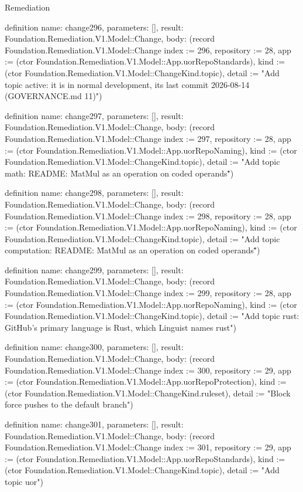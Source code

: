 \begin{lexlean}{Remediation}
\begin{semanticmodule}
definition{
  name: change296,
  parameters: [],
  result: Foundation.Remediation.V1.Model::Change,
  body: (record Foundation.Remediation.V1.Model::Change {index := 296, repository := 28, app := (ctor Foundation.Remediation.V1.Model::App.uorRepoStandards), kind := (ctor Foundation.Remediation.V1.Model::ChangeKind.topic), detail := "Add topic active: it is in normal development, its last commit 2026-08-14 (GOVERNANCE.md 11)"})
}

definition{
  name: change297,
  parameters: [],
  result: Foundation.Remediation.V1.Model::Change,
  body: (record Foundation.Remediation.V1.Model::Change {index := 297, repository := 28, app := (ctor Foundation.Remediation.V1.Model::App.uorRepoNaming), kind := (ctor Foundation.Remediation.V1.Model::ChangeKind.topic), detail := "Add topic math: README: \"MatMul as an operation on coded operands\""})
}

definition{
  name: change298,
  parameters: [],
  result: Foundation.Remediation.V1.Model::Change,
  body: (record Foundation.Remediation.V1.Model::Change {index := 298, repository := 28, app := (ctor Foundation.Remediation.V1.Model::App.uorRepoNaming), kind := (ctor Foundation.Remediation.V1.Model::ChangeKind.topic), detail := "Add topic computation: README: \"MatMul as an operation on coded operands\""})
}

definition{
  name: change299,
  parameters: [],
  result: Foundation.Remediation.V1.Model::Change,
  body: (record Foundation.Remediation.V1.Model::Change {index := 299, repository := 28, app := (ctor Foundation.Remediation.V1.Model::App.uorRepoNaming), kind := (ctor Foundation.Remediation.V1.Model::ChangeKind.topic), detail := "Add topic rust: GitHub's primary language is Rust, which Linguist names rust"})
}

definition{
  name: change300,
  parameters: [],
  result: Foundation.Remediation.V1.Model::Change,
  body: (record Foundation.Remediation.V1.Model::Change {index := 300, repository := 29, app := (ctor Foundation.Remediation.V1.Model::App.uorRepoProtection), kind := (ctor Foundation.Remediation.V1.Model::ChangeKind.ruleset), detail := "Block force pushes to the default branch"})
}

definition{
  name: change301,
  parameters: [],
  result: Foundation.Remediation.V1.Model::Change,
  body: (record Foundation.Remediation.V1.Model::Change {index := 301, repository := 29, app := (ctor Foundation.Remediation.V1.Model::App.uorRepoStandards), kind := (ctor Foundation.Remediation.V1.Model::ChangeKind.topic), detail := "Add topic uor"})
}


\end{semanticmodule}
\end{lexlean}
